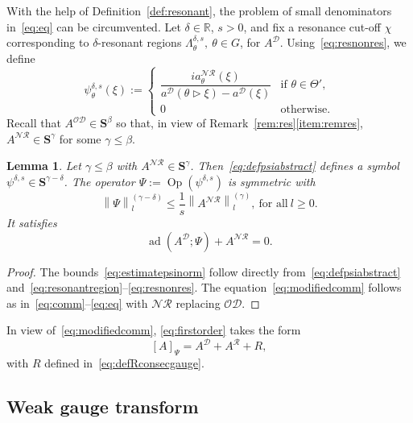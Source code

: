 \documentclass[10pt]{amsart}
\newtheorem{lemm}[theo]{Lemma}\newtheorem{prop}[theo]{Proposition}\newtheorem{coro}[theo]{Corollary}\newtheorem{conj}[theo]{Conjecture}
\theoremstyle{definition}\newtheorem{defi}[theo]{Definition}\newtheorem{rema}[theo]{Remark}\newtheorem{exam}[theo]{Example}\newtheorem{nota}[theo]{Notation}
\DeclareMathOperator{\ad}{ad}
\DeclareMathOperator{\Op}{Op}
\newcommand{\R}{\mathbb R}
\newcommand{\CD}{\mathcal{D}}
\newcommand{\CN}{\mathcal{N}}
\newcommand{\CO}{\mathcal{O}}
\newcommand{\CR}{\mathcal{R}}
\newcommand{\COD}{{\CO\CD}}
\newcommand{\CNR}{{\CN\!\CR}}
\newcommand{\BS}{\mathbf S}
\newcommand{\resc}{s}
\newcommand{\rco}{\chi}
\newcommand{\act}{\triangleright}
\newcommand{\snorm}[3]{\left\| #1\right\|_{#3}^{(#2)}}
\begin{document}
With the help of Definition~\ref{def:resonant}, the problem of small denominators in~\eqref{eq:eq} can be circumvented. Let $\delta\in\R$, $s>0$, and fix a resonance cut-off $\rco$ corresponding to $\delta$-resonant regions $\Lambda_\theta^{\delta,\resc}, \ \theta\in G$, for $A^\CD$. Using~\eqref{eq:resnonres}, we define
\begin{equation}\label{eq:defpsiabstract}
\psi_\theta^{\delta,s}(\xi):=
\begin{cases}
\dfrac{ia^\CNR_\theta(\xi)}{a^\CD(\theta\act\xi)-a^\CD(\xi)}&
\text{if } \theta\in\Theta',\\[2ex] 0 & \text{otherwise}.
\end{cases}
\end{equation}
Recall that $A^{\COD}\in\BS^\beta$ so that, in view of Remark~\ref{rem:res}\eqref{item:remres}, $A^{\CNR}\in \BS^\gamma$ for some $\gamma\leq\beta$.
\begin{lemm}\label{lem:psi}
Let $\gamma\leq \beta$ with $A^{\CNR}\in \BS^\gamma$. Then~\eqref{eq:defpsiabstract} defines a symbol $\psi^{\delta,s} \in \BS^{\gamma-\delta}$. The operator $\Psi:=\Op(\psi^{\delta,s})$ is symmetric with
\begin{equation}\label{eq:estimatepsinorm}
\snorm{\Psi}{\gamma - \delta}{l} \le \frac 1 \resc \snorm{A^\CNR}{\gamma}{l}, \ \text{for all}\ l\geq 0.
\end{equation}
It satisfies
\begin{equation}\label{eq:modifiedcomm}
\ad\left(A^\CD;\Psi\right)+A^{\CNR}=0.
\end{equation}
\end{lemm}
\begin{proof}
The bounds~\eqref{eq:estimatepsinorm} follow directly from~\eqref{eq:defpsiabstract} and~\eqref{eq:resonantregion}--\eqref{eq:resnonres}. The equation~\eqref{eq:modifiedcomm} follows as in~\eqref{eq:comm}--\eqref{eq:eq} with $\CNR$ replacing $\CO\CD$.
\end{proof}


In view of~\eqref{eq:modifiedcomm}, \eqref{eq:firstorder} takes the form
\begin{equation}\label{eq:A'}
[A]_\Psi=A^\CD+A^{\CR}+R,
\end{equation}
with $R$ defined in~\eqref{eq:defRconsecgauge}.

\subsection{Weak gauge transform}\label{subsec:weakgauge}
\end{document}
